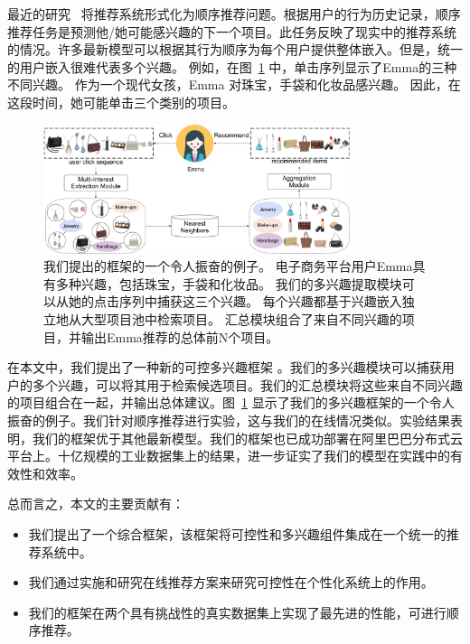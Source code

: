 最近的研究~\cite{kang2018self,chen2018sequential,lv2019sdm} 将推荐系统形式化为顺序推荐问题。根据用户的行为历史记录，顺序推荐任务是预测他/她可能感兴趣的下一个项目。此任务反映了现实中的推荐系统的情况。许多最新模型可以根据其行为顺序为每个用户提供整体嵌入。但是，统一的用户嵌入很难代表多个兴趣。 例如，在图~\ref{fig:multiple_interest} 中，单击序列显示了Emma的三种不同兴趣。 作为一个现代女孩，Emma 对珠宝，手袋和化妆品感兴趣。 因此，在这段时间，她可能单击三个类别的项目。


\begin{figure}
    \centering
    \includegraphics[width=0.8\textwidth]{figures/multi-interest-overview.pdf}
    \caption{我们提出的框架的一个令人振奋的例子。 电子商务平台用户Emma具有多种兴趣，包括珠宝，手袋和化妆品。 我们的多兴趣提取模块可以从她的点击序列中捕获这三个兴趣。 每个兴趣都基于兴趣嵌入独立地从大型项目池中检索项目。 汇总模块组合了来自不同兴趣的项目，并输出Emma推荐的总体前N个项目。 }
    \label{fig:multiple_interest}
\end{figure}

在本文中，我们提出了一种新的可控多兴趣框架 \model。我们的多兴趣模块可以捕获用户的多个兴趣，可以将其用于检索候选项目。我们的汇总模块将这些来自不同兴趣的项目组合在一起，并输出总体建议。图~\ref{fig:multiple_interest} 显示了我们的多兴趣框架的一个令人振奋的例子。我们针对顺序推荐进行实验，这与我们的在线情况类似。实验结果表明，我们的框架优于其他最新模型。我们的框架也已成功部署在阿里巴巴分布式云平台上。十亿规模的工业数据集上的结果，进一步证实了我们的模型在实践中的有效性和效率。

总而言之，本文的主要贡献有：
\begin{itemize}
    \item 我们提出了一个综合框架，该框架将可控性和多兴趣组件集成在一个统一的推荐系统中。
    \item 我们通过实施和研究在线推荐方案来研究可控性在个性化系统上的作用。
    \item 我们的框架在两个具有挑战性的真实数据集上实现了最先进的性能，可进行顺序推荐。
\end{itemize}

